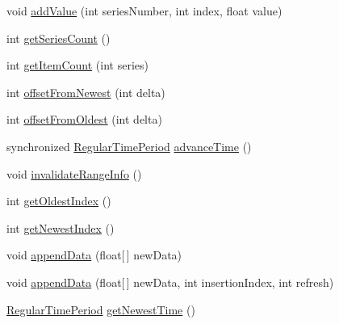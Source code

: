 \begin{DoxyCompactItemize}
\item 
void \mbox{\hyperlink{classorg_1_1jfree_1_1data_1_1time_1_1_dynamic_time_series_collection_ad88bce5caf7774e01dd88b9b02183744}{add\+Value}} (int series\+Number, int index, float value)
\item 
int \mbox{\hyperlink{classorg_1_1jfree_1_1data_1_1time_1_1_dynamic_time_series_collection_a52de34df9ae5ca987aa54da82cd9a8b9}{get\+Series\+Count}} ()
\item 
int \mbox{\hyperlink{classorg_1_1jfree_1_1data_1_1time_1_1_dynamic_time_series_collection_a6d6c9707eb80cec828d2c9c70d5be33e}{get\+Item\+Count}} (int series)
\item 
int \mbox{\hyperlink{classorg_1_1jfree_1_1data_1_1time_1_1_dynamic_time_series_collection_acac214fc3798d2fa365060d00c9e7caf}{offset\+From\+Newest}} (int delta)
\item 
int \mbox{\hyperlink{classorg_1_1jfree_1_1data_1_1time_1_1_dynamic_time_series_collection_aba7ddce43c331b3dcf877eec01dbc6c7}{offset\+From\+Oldest}} (int delta)
\item 
synchronized \mbox{\hyperlink{classorg_1_1jfree_1_1data_1_1time_1_1_regular_time_period}{Regular\+Time\+Period}} \mbox{\hyperlink{classorg_1_1jfree_1_1data_1_1time_1_1_dynamic_time_series_collection_a5ec2d3af4a7ef989e2caf77ffe8121dc}{advance\+Time}} ()
\item 
void \mbox{\hyperlink{classorg_1_1jfree_1_1data_1_1time_1_1_dynamic_time_series_collection_ac59d3cdf115f0e93b1741ddf30557779}{invalidate\+Range\+Info}} ()
\item 
int \mbox{\hyperlink{classorg_1_1jfree_1_1data_1_1time_1_1_dynamic_time_series_collection_a5823fd46a425e925939836ae21a4f40d}{get\+Oldest\+Index}} ()
\item 
int \mbox{\hyperlink{classorg_1_1jfree_1_1data_1_1time_1_1_dynamic_time_series_collection_a3d0312193c19eff389626044e4e9d28d}{get\+Newest\+Index}} ()
\item 
void \mbox{\hyperlink{classorg_1_1jfree_1_1data_1_1time_1_1_dynamic_time_series_collection_aa6259174ec34b944b2cd14a36562c01a}{append\+Data}} (float\mbox{[}$\,$\mbox{]} new\+Data)
\item 
void \mbox{\hyperlink{classorg_1_1jfree_1_1data_1_1time_1_1_dynamic_time_series_collection_a22d2ef9d2a5591bbb6e5569f11db5160}{append\+Data}} (float\mbox{[}$\,$\mbox{]} new\+Data, int insertion\+Index, int refresh)
\item 
\mbox{\hyperlink{classorg_1_1jfree_1_1data_1_1time_1_1_regular_time_period}{Regular\+Time\+Period}} \mbox{\hyperlink{classorg_1_1jfree_1_1data_1_1time_1_1_dynamic_time_series_collection_aa773dfdb358adda976f97820415828cc}{get\+Newest\+Time}} ()

\end{DoxyCompactItemize}
